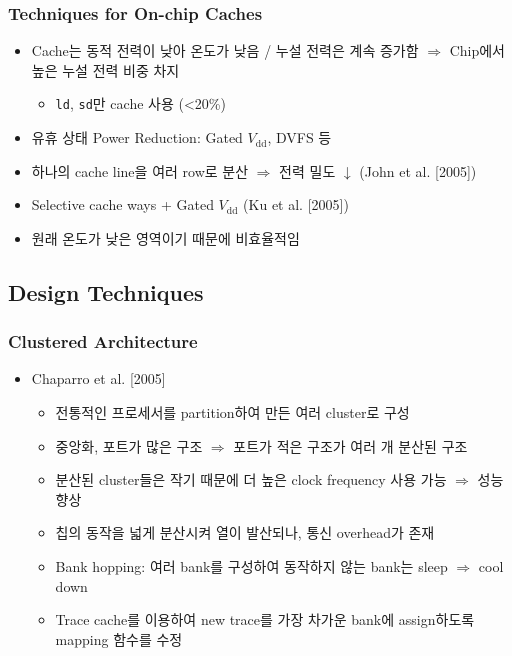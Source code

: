 \subsubsection*{Techniques for On-chip Caches}
\begin{itemize}
    \item Cache는 동적 전력이 낮아 온도가 낮음 / 누설 전력은 계속 증가함 $\Rightarrow$ Chip에서 높은 누설 전력 비중 차지
    \begin{itemize}
        \item \texttt{ld}, \texttt{sd}만 cache 사용 (\textless 20\%)
    \end{itemize}
    \item 유휴 상태 Power Reduction: Gated $V_{\mathrm{dd}}$, DVFS 등
    \item 하나의 cache line을 여러 row로 분산 $\Rightarrow$ 전력 밀도 $\downarrow$ (John et al. [2005])
    \item Selective cache ways + Gated $V_{\mathrm{dd}}$ (Ku et al. [2005])
    \item 원래 온도가 낮은 영역이기 때문에 비효율적임
\end{itemize}

\subsection{Design Techniques}

\subsubsection*{Clustered Architecture}
\begin{itemize}
    \item Chaparro et al. [2005]
    \begin{itemize}
        \item 전통적인 프로세서를 partition하여 만든 여러 cluster로 구성
        \item 중앙화, 포트가 많은 구조 $\Rightarrow$ 포트가 적은 구조가 여러 개 분산된 구조
        \item 분산된 cluster들은 작기 때문에 더 높은 clock frequency 사용 가능 $\Rightarrow$ 성능 향상
        \item 칩의 동작을 넓게 분산시켜 열이 발산되나, 통신 overhead가 존재
        \item Bank hopping: 여러 bank를 구성하여 동작하지 않는 bank는 sleep $\Rightarrow$ cool down
        \item Trace cache를 이용하여 new trace를 가장 차가운 bank에 assign하도록 mapping 함수를 수정
    \end{itemize}
\end{itemize}

